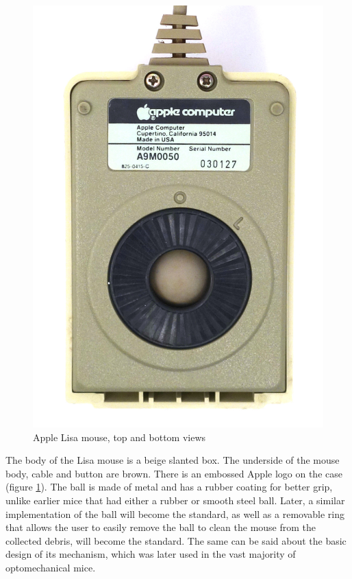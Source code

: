 \documentclass[11pt, a4paper]{article}
\begin{document}
\begin{figure}[h]
    \includegraphics[scale=0.7]{1983_apple_lisa_mouse/applebottom_60.jpg}
    \caption{Apple Lisa mouse, top and bottom views}
    \label{fig:AppleLisaTopAndBottom}
\end{figure}

The body of the Lisa mouse is a beige slanted box. The underside of the mouse body, cable and button are brown. There is an embossed Apple logo on the case (figure \ref{fig:AppleLisaTopAndBottom}). The ball is made of metal and has a rubber coating for better grip, unlike earlier mice that had either a rubber or smooth steel ball. Later, a similar implementation of the ball will become the standard, as well as a removable ring that allows the user to easily remove the ball to clean the mouse from the collected debris, will become the standard. The same can be said about the basic design of its mechanism, which was later used in the vast majority of optomechanical mice.
\end{document}
